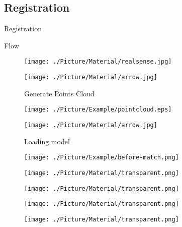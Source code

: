\documentclass[xcolor=table,compress,blue]{beamer}
\begin{document}
\subsection{Registration}
\begin{frame}{Registration}
	\begin{exampleblock}{Flow}
		\begin{figure}[htpb]
			\centering
			\begin{minipage}[b]{0.8in}
				\centerline{ \texttt{[image: ./Picture/Material/realsense.jpg]} }
			\end{minipage}
			\begin{minipage}[b]{0.8in}
				\centerline{ \quad}
				\centerline{ \texttt{[image: ./Picture/Material/arrow.jpg]} }
				\centerline{\tiny{Generate Points Cloud}}
			\end{minipage}
			\begin{minipage}[b]{0.8in}
				\centerline{ \texttt{[image: ./Picture/Example/pointcloud.eps]} }
			\end{minipage}
			\begin{minipage}[b]{0.8in}
				\centerline{ \texttt{[image: ./Picture/Material/arrow.jpg]} }
				\centerline{\tiny{Loading model}}
			\end{minipage}
			\begin{minipage}[b]{0.8in}
				\centerline{ \texttt{[image: ./Picture/Example/before-match.png]} }
			\end{minipage}
		\end{figure}
		\vspace{-25pt}
		\begin{figure}[htpb]
			\centering
			\begin{minipage}[b]{0.8in}
				\centerline{ \texttt{[image: ./Picture/Material/transparent.png]} }
			\end{minipage}
			\begin{minipage}[b]{0.8in}
				\centerline{ \texttt{[image: ./Picture/Material/transparent.png]} }
			\end{minipage}
			\begin{minipage}[b]{0.8in}
				\centerline{ \texttt{[image: ./Picture/Material/transparent.png]} }
			\end{minipage}
			\begin{minipage}[b]{0.8in}
				\centerline{ \texttt{[image: ./Picture/Material/transparent.png]} }

\end{minipage}
\end{figure}
\end{exampleblock}
\end{frame}
\end{document}

